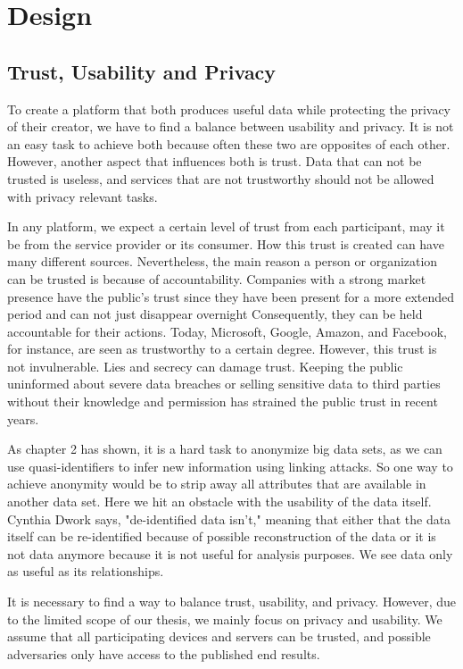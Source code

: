 
\chapter{Design}\label{chapter:design}
\section{Trust, Usability and Privacy}
To create a platform that both produces useful data while protecting the privacy of their creator, we have to find a balance between usability and privacy. It is not an easy task to achieve both because often these two are opposites of each other. However, another aspect that influences both is trust. Data that can not be trusted is useless, and services that are not trustworthy should not be allowed with privacy relevant tasks.
 
In any platform, we expect a certain level of trust from each participant, may it be from the service provider or its consumer. How this trust is created can have many different sources. Nevertheless, the main reason a person or organization can be trusted is because of accountability. Companies with a strong market presence have the public's trust since they have been present for a more extended period and can not just disappear overnight
 Consequently, they can be held accountable for their actions. Today, Microsoft, Google, Amazon, and Facebook, for instance, are seen as trustworthy to a certain degree. However, this trust is not invulnerable. Lies and secrecy can damage trust. Keeping the public uninformed about severe data breaches or selling sensitive data to third parties without their knowledge and permission has strained the public trust in recent years.

As chapter 2 has shown, it is a hard task to anonymize big data sets, as we can use quasi-identifiers to infer new information using linking attacks. So one way to achieve anonymity would be to strip away all attributes that are available in another data set. Here we hit an obstacle with the usability of the data itself. Cynthia Dwork \cite{dwork} says, "de-identified data isn't," meaning that either that the data itself can be re-identified because of possible reconstruction of the data or it is not data anymore because it is not useful for analysis purposes. We see data only as useful as its relationships.

It is necessary to find a way to balance trust, usability, and privacy. However, due to the limited scope of our thesis, we mainly focus on privacy and usability. We assume that all participating devices and servers can be trusted, and possible adversaries only have access to the published end results.

